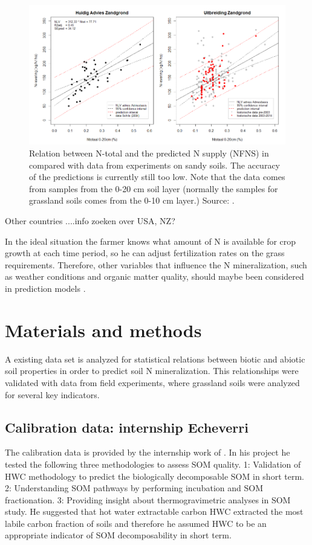 \documentclass[10pt,twoside,dutch,english]{report}
\begin{document}
		\begin{figure}[t]
			\includegraphics[width=1\linewidth]{intro_ros}
			\caption{Relation between N-total and the predicted N supply (NFNS) in compared with data from experiments on sandy soils. The accuracy of the predictions is currently still too low. Note that the data comes from samples from the 0-20 cm soil layer (normally the samples for grassland soils comes from the 0-10 cm layer.) Source:   \citet{Ros2015}. }
			\label{fig:intro_ros}
		\end{figure}
		
Other countries ....info zoeken over USA, NZ?

  In the ideal situation the farmer knows what amount of N is available for crop growth at each time period, so he can adjust fertilization rates on the grass requirements. Therefore, other variables that influence the N mineralization, such as weather conditions and organic matter quality, should maybe been considered in prediction models \citep{Ros2015}. 

	


	
	
	
	

\chapter{Materials and methods}

A existing data set is analyzed for statistical relations between biotic and abiotic soil properties in order to predict soil N mineralization. This relationships were validated with data from field experiments, where grassland soils were analyzed for several key indicators. 

\section{Calibration data: internship Echeverri}
The calibration data is provided by the internship work of  \citet{Echeverri2014}. In his project he tested the following three methodologies to assess SOM quality. 1: Validation of  HWC methodology to predict the biologically decomposable SOM in short term. 2: Understanding SOM pathways by performing incubation and SOM fractionation. 3: Providing insight about thermogravimetric analyses in SOM study.  He suggested that hot water extractable carbon HWC extracted the most labile carbon fraction of soils and therefore he assumed HWC to be an appropriate indicator of SOM decomposability in short term.
\end{document}
